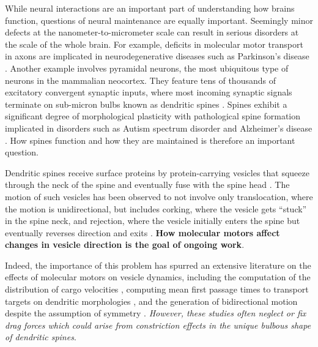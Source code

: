 \documentclass[a4paper,11pt]{article}
\begin{document}
While neural interactions are an important part of understanding how brains function, questions of neural maintenance are equally important. Seemingly minor defects at the nanometer-to-micrometer scale can result in serious disorders at the scale of the whole brain. For example, deficits in molecular motor transport in axons are implicated in neurodegenerative diseases such as Parkinson's disease \cite{millecamps2013axonal}. Another example involves pyramidal neurons, the most ubiquitous type of neurons in the mammalian neocortex. They feature tens of thousands of excitatory convergent synaptic inputs, where most incoming synaptic signals terminate on sub-micron bulbs known as dendritic spines \cite{nimchinsky2002structure}. Spines exhibit a significant degree of morphological plasticity \cite{kasai2010structural} with pathological spine formation implicated in disorders such as Autism spectrum disorder and Alzheimer's disease \cite{penzes2011dendritic}. How spines function and how they are maintained is therefore an important question.

Dendritic spines receive surface proteins by protein-carrying vesicles that squeeze through the neck of the spine and eventually fuse with the spine head \cite{da2015positioning}. The motion of such vesicles has been observed to not involve only translocation, where the motion is unidirectional, but includes corking, where the vesicle gets ``stuck'' in the spine neck, and rejection, where the vesicle initially enters the spine but eventually reverses direction and exits \cite{park2006plasticity}. \textbf{How molecular motors affect changes in vesicle direction is the goal of ongoing work}.

Indeed, the importance of this problem has spurred an extensive literature on the effects of molecular motors on vesicle dynamics, including the computation of the distribution of cargo velocities \cite{kunwar2011mechanical}, computing mean first passage times to transport targets on dendritic morphologies \cite{bressloff2013metastability}, and the generation of bidirectional motion despite the assumption of symmetry \cite{portet2019deciphering}. \textit{However, these studies often neglect or fix drag forces which could arise from constriction effects in the unique bulbous shape of dendritic spines}.
\end{document}
